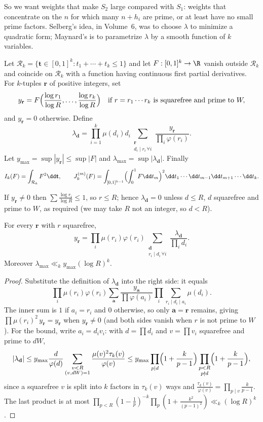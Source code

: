 So we want weights that make $S_2$ large compared with $S_1$: weights that concentrate on the $n$ for which many $n+h_i$ are prime, or at least have no small prime factors. Selberg's idea, in Volume~6, was to choose $\lambda$ to minimize a quadratic form; Maynard's is to parametrize $\lambda$ by a smooth function of $k$ variables.

\begin{definition}\label{def:yweights}
Let $\mathcal R_k=\{\mathbf t\in[0,1]^k:t_1+\cdots+t_k\le1\}$ and let $F:[0,1]^k\to\R$ vanish outside $\mathcal R_k$ and coincide on $\mathcal R_k$ with a function having continuous first partial derivatives. For $k$-tuples $\mathbf r$ of positive integers, set
\[
y_{\mathbf r}=F\Bigl(\frac{\log r_1}{\log R},\dots,\frac{\log r_k}{\log R}\Bigr)\quad\text{if }r=r_1\cdots r_k\text{ is squarefree and prime to }W,
\]
and $y_{\mathbf r}=0$ otherwise. Define
\[
\lambda_{\mathbf d}=\prod_{i=1}^k\mu(d_i)d_i\sum_{\substack{\mathbf r\\d_i\mid r_i\,\forall i}}\frac{y_{\mathbf r}}{\prod_i\varphi(r_i)}.
\]
Let $y_{\max}=\sup|y_{\mathbf r}|\le\sup|F|$ and $\lambda_{\max}=\sup|\lambda_{\mathbf d}|$. Finally
\[
I_k(F)=\int_{\mathcal R_k}F^2\dd\mathbf t,\qquad J_k^{(m)}(F)=\int_{[0,1]^{k-1}}\Bigl(\int_0^1F\dd t_m\Bigr)^2\dd t_1\cdots\dd t_{m-1}\dd t_{m+1}\cdots\dd t_k.
\]
\end{definition}

If $y_{\mathbf r}\ne0$ then $\sum\frac{\log r_i}{\log R}\le1$, so $r\le R$; hence $\lambda_{\mathbf d}=0$ unless $d\le R$, $d$ squarefree and prime to $W$, as required (we may take $R$ not an integer, so $d<R$).

\begin{lemma}\label{lem:inversion}
For every $\mathbf r$ with $r$ squarefree,
\[
y_{\mathbf r}=\prod_i\mu(r_i)\varphi(r_i)\sum_{\substack{\mathbf d\\r_i\mid d_i\,\forall i}}\frac{\lambda_{\mathbf d}}{\prod_id_i}.
\]
Moreover $\lambda_{\max}\ll_ky_{\max}(\log R)^k$.
\end{lemma}
\begin{proof}
Substitute the definition of $\lambda_{\mathbf d}$ into the right side: it equals
\[
\prod_i\mu(r_i)\varphi(r_i)\sum_{\mathbf a}\frac{y_{\mathbf a}}{\prod\varphi(a_i)}\prod_i\sum_{r_i\mid d_i\mid a_i}\mu(d_i).
\]
The inner sum is $1$ if $a_i=r_i$ and $0$ otherwise, so only $\mathbf a=\mathbf r$ remains, giving $\prod\mu(r_i)^2\,y_{\mathbf r}=y_{\mathbf r}$ when $y_{\mathbf r}\ne0$ (and both sides vanish when $r$ is not prime to $W$). For the bound, write $a_i=d_iv_i$: with $d=\prod d_i$ and $v=\prod v_i$ squarefree and prime to $dW$,
\[
|\lambda_{\mathbf d}|\le y_{\max}\frac d{\varphi(d)}\sum_{\substack{v<R\\(v,dW)=1}}\frac{\mu(v)^2\tau_k(v)}{\varphi(v)}\le y_{\max}\prod_{p\mid d}\Bigl(1+\frac k{p-1}\Bigr)\prod_{\substack{p<R\\p\nmid d}}\Bigl(1+\frac k{p-1}\Bigr),
\]
since a squarefree $v$ is split into $k$ factors in $\tau_k(v)$ ways and $\frac{\tau_k(v)}{\varphi(v)}=\prod_{p\mid v}\frac k{p-1}$. The last product is at most $\prod_{p<R}(1-\frac1p)^{-k}\prod_p(1+\frac{k^2}{(p-1)^2})\ll_k(\log R)^k$.
\end{proof}

